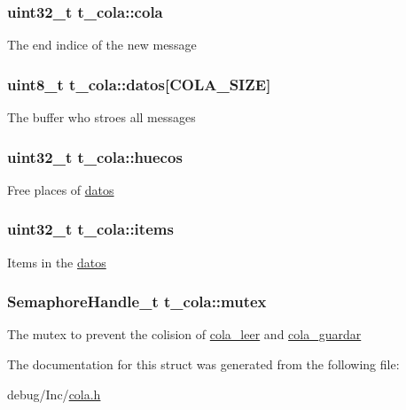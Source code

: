 \subsubsection[{\texorpdfstring{cola}{cola}}]{\setlength{\rightskip}{0pt plus 5cm}uint32\+\_\+t t\+\_\+cola\+::cola}\hypertarget{structt__cola_a8b818616f62d19293390150f6c05b0c4}{}\label{structt__cola_a8b818616f62d19293390150f6c05b0c4}
The end indice of the new message 
\subsubsection[{\texorpdfstring{datos}{datos}}]{\setlength{\rightskip}{0pt plus 5cm}uint8\+\_\+t t\+\_\+cola\+::datos\mbox{[}{\bf C\+O\+L\+A\+\_\+\+S\+I\+ZE}\mbox{]}}\hypertarget{structt__cola_a61215b1ae633a2a4463e0abf0a796f41}{}\label{structt__cola_a61215b1ae633a2a4463e0abf0a796f41}
The buffer who stroes all messages 
\subsubsection[{\texorpdfstring{huecos}{huecos}}]{\setlength{\rightskip}{0pt plus 5cm}uint32\+\_\+t t\+\_\+cola\+::huecos}\hypertarget{structt__cola_aacfbba6a49f77a9a6f52a93c95808095}{}\label{structt__cola_aacfbba6a49f77a9a6f52a93c95808095}
Free places of \hyperlink{structt__cola_a61215b1ae633a2a4463e0abf0a796f41}{datos} 
\subsubsection[{\texorpdfstring{items}{items}}]{\setlength{\rightskip}{0pt plus 5cm}uint32\+\_\+t t\+\_\+cola\+::items}\hypertarget{structt__cola_af6a7ddbb78818f9185454bdda842a355}{}\label{structt__cola_af6a7ddbb78818f9185454bdda842a355}
Items in the \hyperlink{structt__cola_a61215b1ae633a2a4463e0abf0a796f41}{datos} 
\subsubsection[{\texorpdfstring{mutex}{mutex}}]{\setlength{\rightskip}{0pt plus 5cm}Semaphore\+Handle\+\_\+t t\+\_\+cola\+::mutex}\hypertarget{structt__cola_a6ab2b175f6265b861c97da1db60eaaf5}{}\label{structt__cola_a6ab2b175f6265b861c97da1db60eaaf5}
The mutex to prevent the colision of \hyperlink{group___cola___exported___functions___group2_ga12fe948f259d8c9d7a390a76c416b55c}{cola\+\_\+leer} and \hyperlink{group___cola___exported___functions___group2_gaa639dba8be8eec5d19259aeb8de2cd7a}{cola\+\_\+guardar} 

The documentation for this struct was generated from the following file\+:\begin{DoxyCompactItemize}
\item 
debug/\+Inc/\hyperlink{cola_8h}{cola.\+h}\end{DoxyCompactItemize}
